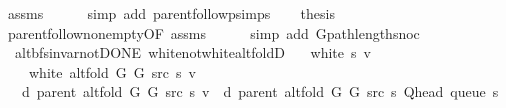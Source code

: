 \begin{isabellebody}
\ assms\isanewline
\ \ \ \ \isamarkupfalse%
\ {\isacharparenleft}{\kern0pt}simp\ add{\isacharcolon}{\kern0pt}\ parent{\isachardot}{\kern0pt}follow{\isacharunderscore}{\kern0pt}psimps{\isacharparenright}{\kern0pt}\isanewline
\ \ \isamarkupfalse%
\ {\isacharquery}{\kern0pt}thesis\isanewline
\ \ \ \ \isamarkupfalse%
\ parent{\isachardot}{\kern0pt}follow{\isacharunderscore}{\kern0pt}non{\isacharunderscore}{\kern0pt}empty{\isacharbrackleft}{\kern0pt}OF\ assms{\isacharparenleft}{\kern0pt}{}{\isacharparenright}{\kern0pt}{\isacharbrackright}{\kern0pt}\isanewline
\ \ \ \ \isamarkupfalse%
\ {\isacharparenleft}{\kern0pt}simp\ add{\isacharcolon}{\kern0pt}\ G{\isachardot}{\kern0pt}path{\isacharunderscore}{\kern0pt}length{\isacharunderscore}{\kern0pt}snoc{\isacharparenright}{\kern0pt}\isanewline
{}\isamarkupfalse%
%
\endisatagproof
{\isafoldproof}%
%
\isadelimproof
\isanewline
%
\endisadelimproof
%
\isadeliminvisible
\isanewline
%
\endisadeliminvisible
%
\isataginvisible
{}\isamarkupfalse%
\ {\isacharparenleft}{\kern0pt}\ alt{\isacharunderscore}{\kern0pt}bfs{\isacharunderscore}{\kern0pt}invar{\isacharunderscore}{\kern0pt}not{\isacharunderscore}{\kern0pt}DONE{\isacharparenright}{\kern0pt}\ white{\isacharunderscore}{\kern0pt}not{\isacharunderscore}{\kern0pt}white{\isacharunderscore}{\kern0pt}alt{\isacharunderscore}{\kern0pt}foldD{\isacharunderscore}{\kern0pt}{}{\isacharcolon}{\kern0pt}\isanewline
\ \ \ {\isachardoublequoteopen}white\ s\ v{\isachardoublequoteclose}\isanewline
\ \ \ {\isachardoublequoteopen}{\isasymnot}\ white\ {\isacharparenleft}{\kern0pt}alt{\isacharunderscore}{\kern0pt}fold\ G{}\ G{}\ src\ s{\isacharparenright}{\kern0pt}\ v{\isachardoublequoteclose}\isanewline
\ \ \ {\isachardoublequoteopen}d\ {\isacharparenleft}{\kern0pt}parent\ {\isacharparenleft}{\kern0pt}alt{\isacharunderscore}{\kern0pt}fold\ G{}\ G{}\ src\ s{\isacharparenright}{\kern0pt}{\isacharparenright}{\kern0pt}\ v\ {\isacharequal}{\kern0pt}\ d\ {\isacharparenleft}{\kern0pt}parent\ {\isacharparenleft}{\kern0pt}alt{\isacharunderscore}{\kern0pt}fold\ G{}\ G{}\ src\ s{\isacharparenright}{\kern0pt}{\isacharparenright}{\kern0pt}\ {\isacharparenleft}{\kern0pt}Q{\isacharunderscore}{\kern0pt}head\ {\isacharparenleft}{\kern0pt}queue\ s{\isacharparenright}{\kern0pt}{\isacharparenright}{\kern0pt}\ {\isacharplus}{\kern0pt}\ {}{\isachardoublequoteclose}%

\end{isabellebody}
